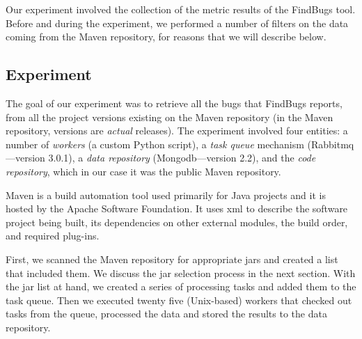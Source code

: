 \documentclass[letterpaper,twocolumn,10pt]{article}
\begin{document}
Our experiment involved the collection of the metric results of the
FindBugs tool. Before and during the experiment, we performed a number
of filters on the data coming from the Maven repository, for reasons
that we will describe below.

\subsection{Experiment}
\label{sec:exp}

The goal of our experiment was to retrieve all the bugs that FindBugs reports,
from all the project versions existing on the Maven repository (in the Maven
repository, versions are {\it actual} releases). The experiment involved four entities:
a number of {\it workers} (a custom Python script), a {\it task queue}
mechanism (Rabbit{\sc mq}---version 3.0.1),
a {\it data repository} (Mongo{\sc db}---version 2.2),
and the {\it code repository}, which in our case it was
the public Maven repository.


Maven is a build automation tool used primarily for Java projects and it is
hosted by the Apache Software Foundation.
It uses {\sc xml} to describe the software project being built, its dependencies
on other external modules, the build order, and required plug-ins. 

First, we scanned the Maven repository for appropriate {\sc jar}s and created a
list that included them. We discuss the {\sc jar} selection process in the next 
section. With the {\sc jar} list at hand, we created a series of processing tasks
and added them to the task queue. Then we executed twenty five (Unix-based)
workers that checked out tasks from the queue, processed the data and stored the
results to the data repository.
\end{document}
